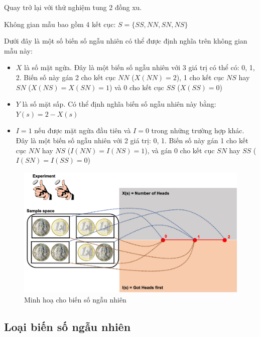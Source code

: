 \documentclass[
]{book}
\begin{document}
Quay trở lại với thử nghiệm tung 2 đồng xu.

Không gian mẫu bao gồm 4 kết cục: \(S = \{SS, NN, SN, NS\}\)

Dưới đây là một số biến số ngẫu nhiên có thể được định nghĩa trên không gian mẫu này:

\begin{itemize}
\item
  \(X\) là số mặt ngửa. Đây là một biến số ngẫu nhiên với 3 giá trị có thể có: 0, 1, 2. Biến số này gán 2 cho kết cục \(NN\) (\(X(NN) = 2\)), 1 cho kết cục \(NS\) hay \(SN\) (\(X(NS) = X(SN) = 1\)) và 0 cho kết cục \(SS\) (\(X(SS) = 0\))
\item
  \(Y\) là số mặt sấp. Có thể định nghĩa biến số ngẫu nhiên này bằng: \(Y(s) = 2 - X(s)\)
\item
  \(I = 1\) nếu được mặt ngửa đầu tiên và \(I = 0\) trong những trường hợp khác. Đây là một biến số ngẫu nhiên với 2 giá trị: 0, 1. Biến số này gán 1 cho kết cục \(NN\) hay \(NS\) (\(I(NN) = I(NS) = 1\)), và gán 0 cho kết cục \(SN\) hay \(SS\) (\(I(SN) = I(SS) = 0\))
\end{itemize}

\begin{figure}

{\centering \includegraphics[width=1\linewidth]{figures/Picture06} 

}

\caption{Minh hoạ cho biến số ngẫu nhiên}\label{fig:unnamed-chunk-4}
\end{figure}

\hypertarget{loux1ea1i-biux1ebfn-sux1ed1-ngux1eabu-nhiuxean}{%
\subsection{Loại biến số ngẫu nhiên}\label{loux1ea1i-biux1ebfn-sux1ed1-ngux1eabu-nhiuxean}}
\end{document}
